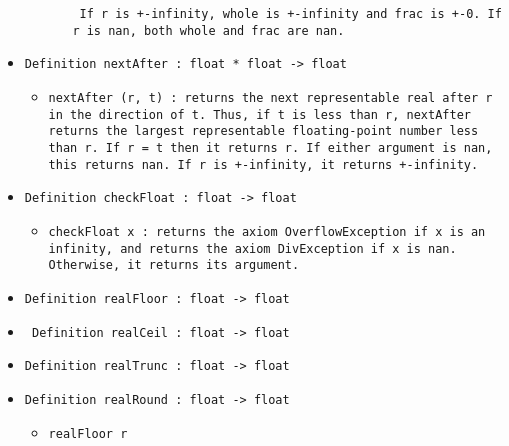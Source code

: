 \documentclass[11pt]{report}
\begin{document}
\begin{itemize}
\begin{itemize}
\begin{itemize}
\begin{flushleft}
\texttt{  If r is +-infinity, whole is +-infinity and frac is +-0. If r is nan, both whole and frac are nan.}  \end{flushleft}



\end{itemize}

\end{itemize}

\item  \texttt{Definition nextAfter : float * float -> float}

\begin{itemize}
\item  \begin{flushleft} \texttt{nextAfter (r, t) : returns the next representable real after r in the direction of t. Thus, if t is less than r, nextAfter returns the largest representable floating-point number less than r. If r = t then it returns r. If either argument is nan, this returns nan. If r is +-infinity, it returns +-infinity. } \end{flushleft}



\end{itemize}

\item  \texttt{Definition checkFloat : float -> float}

\begin{itemize}
\item \begin{flushleft} \texttt{checkFloat x : returns the axiom OverflowException if x is an infinity, and returns the axiom DivException if x is nan. Otherwise, it returns its argument.} \end{flushleft}

\end{itemize}

\item  \texttt{Definition realFloor : float -> float}

\item \texttt{ Definition realCeil : float -> float}

\item  \texttt{Definition realTrunc : float -> float}

\item  \texttt{Definition realRound : float -> float}

\begin{itemize}
\item  \texttt{realFloor r}


\end{itemize}
\end{itemize}
\end{document}
